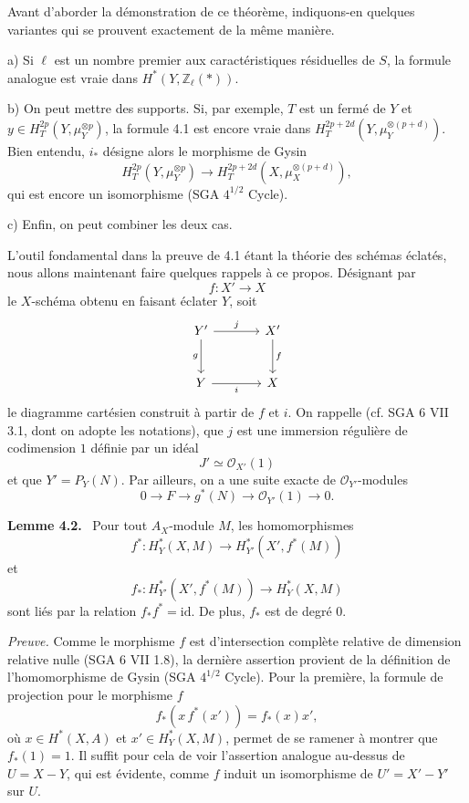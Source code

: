 \documentclass[11pt]{article}
\newenvironment{statement}[1]{\par\medskip\noindent\textbf{#1.}\ }{\par\medskip}
\begin{document}
Avant d'aborder la démonstration de ce théorème, indiquons-en quelques variantes qui se prouvent exactement de la même manière.

a) Si $\ell$ est un nombre premier aux caractéristiques résiduelles de $S$, la formule analogue est vraie dans $H^*(Y,\mathbb Z_\ell(*))$.

b) On peut mettre des supports. Si, par exemple, $T$ est un fermé de $Y$ et $y\in H_T^{2p}(Y,\mu_Y^{\otimes p})$, la formule 4.1 est encore vraie dans $H_T^{2p+2d}(Y,\mu_Y^{\otimes(p+d)})$. Bien entendu, $i_*$ désigne alors le morphisme de Gysin
\[
H_T^{2p}(Y,\mu_Y^{\otimes p})
\to H_T^{2p+2d}(X,\mu_X^{\otimes(p+d)}),
\]
qui est encore un isomorphisme (SGA $4^{1/2}$ Cycle).

c) Enfin, on peut combiner les deux cas.

L'outil fondamental dans la preuve de 4.1 étant la théorie des schémas éclatés, nous allons maintenant faire quelques rappels à ce propos. Désignant par
\[
f:X'\to X
\]
le $X$-schéma obtenu en faisant éclater $Y$, soit
\[
\begin{tikzcd}[column sep=large,row sep=large]
Y' \arrow[r,"j"] \arrow[d,"g"'] & X' \arrow[d,"f"]\\
Y \arrow[r,"i"'] & X
\end{tikzcd}
\]
le diagramme cartésien construit à partir de $f$ et $i$. On rappelle (cf. SGA 6 VII 3.1, dont on adopte les notations), que $j$ est une immersion régulière de codimension $1$ définie par un idéal
\[
J'\simeq\mathcal O_{X'}(1)
\]
et que $Y'=P_Y(N)$. Par ailleurs, on a une suite exacte de $\mathcal O_{Y'}$-modules
\[
0\to F\to g^*(N)\to \mathcal O_{Y'}(1)\to0.
\]

\begin{statement}{Lemme 4.2}
Pour tout $A_X$-module $M$, les homomorphismes
\[
f^*:H_Y^*(X,M)\to H_{Y'}^*(X',f^*(M))
\]
et
\[
f_*:H_{Y'}^*(X',f^*(M))\to H_Y^*(X,M)
\]
sont liés par la relation $f_*f^*=\mathrm{id}$. De plus, $f_*$ est de degré $0$.
\end{statement}

\emph{Preuve.} Comme le morphisme $f$ est d'intersection complète relative de dimension relative nulle (SGA 6 VII 1.8), la dernière assertion provient de la définition de l'homomorphisme de Gysin (SGA $4^{1/2}$ Cycle). Pour la première, la formule de projection pour le morphisme $f$
\[
f_*(x\,f^*(x'))=f_*(x)x',
\]
où $x\in H^*(X,A)$ et $x'\in H_Y^*(X,M)$, permet de se ramener à montrer que $f_*(1)=1$. Il suffit pour cela de voir l'assertion analogue au-dessus de $U=X-Y$, qui est évidente, comme $f$ induit un isomorphisme de $U'=X'-Y'$ sur $U$.
\end{document}
